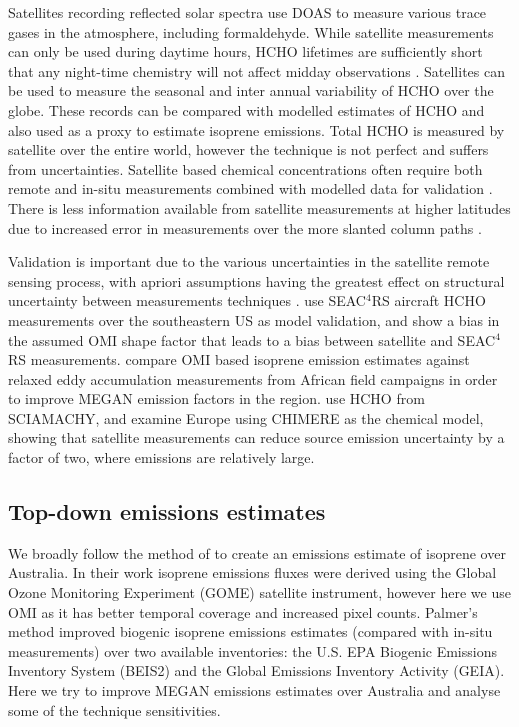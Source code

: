     Satellites recording reflected solar spectra use DOAS to measure various trace gases in the atmosphere, including formaldehyde. 
    While satellite measurements can only be used during daytime hours, HCHO lifetimes are sufficiently short that any night-time chemistry will not affect midday observations \parencite{Wolfe2016}.
    Satellites can be used to measure the seasonal and inter annual variability of HCHO over the globe.
    These records can be compared with modelled estimates of HCHO and also used as a proxy to estimate isoprene emissions.
    Total HCHO is measured by satellite over the entire world, however the technique is not perfect and suffers from uncertainties.
    Satellite based chemical concentrations often require both remote and in-situ measurements combined with modelled data for validation \parencite{Marais2014}.
    There is less information available from satellite measurements at higher latitudes due to increased error in measurements over the more slanted column paths \parencite{DeSmedt2015}.
    
    
    Validation is important due to the various uncertainties in the satellite remote sensing process, with apriori assumptions having the greatest effect on structural uncertainty between measurements techniques \textcite{Lorente2017}.
    \textcite{Zhu2016} use SEAC$^4$RS aircraft HCHO measurements over the southeastern US as model validation, and show a bias in the assumed OMI shape factor that leads to a bias between satellite and SEAC$^4$RS measurements.
    \textcite{Marais2014} compare OMI based isoprene emission estimates against relaxed eddy accumulation measurements from African field campaigns in order to improve MEGAN emission factors in the region.
    \textcite{Dufour2009} use HCHO from SCIAMACHY, and examine Europe using CHIMERE as the chemical model, showing that satellite measurements can reduce source emission uncertainty by a factor of two, where emissions are relatively large.
    
  
  \subsection{Top-down emissions estimates}
    
    We broadly follow the method of \textcite{Palmer2001} to create an emissions estimate of isoprene over Australia.
    In their work isoprene emissions fluxes were derived using the Global Ozone Monitoring Experiment (GOME) satellite instrument, however here we use OMI as it has better temporal coverage and increased pixel counts.
    Palmer's method improved biogenic isoprene emissions estimates (compared with in-situ measurements) over two available inventories: the U.S. EPA Biogenic Emissions Inventory System (BEIS2) and the Global Emissions Inventory Activity (GEIA).
    Here we try to improve MEGAN emissions estimates over Australia and analyse some of the technique sensitivities.

